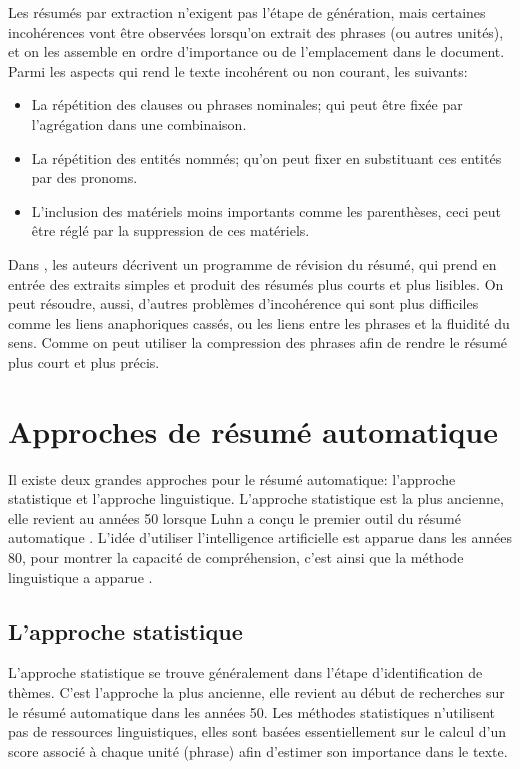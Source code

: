 \documentclass[a4paper,12pt,oneside]{../use/ESIthesis}
\begin{document}
Les résumés par extraction n'exigent pas l'étape de génération, mais certaines incohérences vont être observées lorsqu'on extrait des phrases (ou autres unités), et on les assemble en ordre d'importance ou de l'emplacement dans le document. 
Parmi les aspects qui rend le texte incohérent ou non courant, les suivants:
\begin{itemize}
\item La répétition des clauses ou phrases nominales; qui peut être fixée par l'agrégation dans une combinaison.
\item La répétition des entités nommés; qu'on peut fixer en substituant ces entités par des pronoms.
\item L'inclusion des matériels moins importants comme les parenthèses, ceci peut être réglé par la suppression de ces matériels.
\end{itemize}
Dans \cite{99-mani-al2}, les auteurs décrivent un programme de révision du résumé, qui prend en entrée des extraits simples et produit des résumés plus courts et plus lisibles. 
On peut résoudre, aussi, d'autres problèmes d'incohérence qui sont plus difficiles comme les liens anaphoriques cassés, ou les liens entre les phrases et la fluidité du sens. Comme on peut utiliser la compression des phrases afin de rendre le résumé plus court et plus précis.

\section{Approches de résumé automatique}

Il existe deux grandes approches pour le résumé automatique: l'approche statistique et l'approche linguistique. 
L'approche statistique est la plus ancienne, elle revient au années 50 lorsque Luhn a conçu le premier outil du résumé automatique \cite{58-luhn}. 
L'idée d'utiliser l'intelligence artificielle est apparue dans les années 80, pour montrer la capacité de compréhension, c'est ainsi que la méthode linguistique a apparue \cite{02-minel}.

\subsection{L'approche statistique}

L'approche statistique se trouve généralement dans l'étape d'identification de thèmes. 
C'est l'approche la plus ancienne, elle revient au début de recherches sur le résumé automatique dans les années 50. 
Les méthodes statistiques n'utilisent pas de ressources linguistiques, elles sont basées essentiellement sur le calcul d'un score associé à chaque unité (phrase) afin d'estimer son importance dans le texte.
\end{document}
